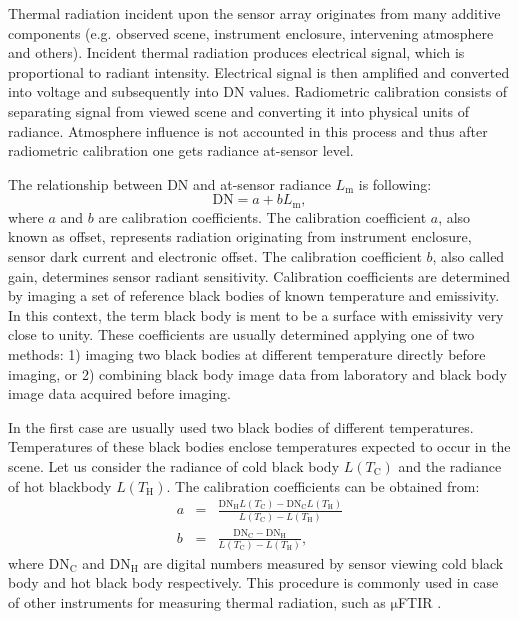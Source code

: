 Thermal radiation incident upon the sensor array originates from many additive components (e.g. observed scene, instrument enclosure, intervening atmosphere and others). Incident thermal radiation produces electrical signal, which is proportional to radiant intensity. Electrical signal is then amplified and converted into voltage and subsequently into DN values. Radiometric calibration consists of separating signal from viewed scene and converting it into physical units of radiance. Atmosphere influence is not accounted in this process and thus after radiometric calibration one gets radiance at-sensor level.

The relationship between DN and at-sensor radiance $L_\mathrm{m}$ is following:
$$ \mathrm{DN} = a + b L_\mathrm{m}, $$
where $a$ and $b$ are calibration coefficients. The calibration coefficient $a$, also known as offset, represents radiation originating from instrument enclosure, sensor dark current and electronic offset. The calibration coefficient $b$, also called gain, determines sensor radiant sensitivity. Calibration coefficients are determined by imaging a set of reference black bodies of known temperature and emissivity. In this context, the term black body is ment to be a surface with emissivity very close to unity. These coefficients are usually determined applying one of two methods: 1) imaging two black bodies at different temperature directly before imaging, or 2) combining black body image data from laboratory and black body image data acquired before imaging.

In the first case are usually used two black bodies of different temperatures. Temperatures of these black bodies enclose temperatures expected to occur in the scene. Let us consider the radiance of cold black body $L(T_\mathrm{C})$ and the radiance of hot blackbody $L(T_\mathrm{H})$. The calibration coefficients can be obtained from:
\begin{eqnarray*}
	a &=& \frac{\mathrm{DN}_\mathrm{H} L(T_\mathrm{C}) - \mathrm{DN}_\mathrm{C} L(T_\mathrm{H}) }{ L(T_\mathrm{C}) - L(T_\mathrm{H}) } \\
	b &=& \frac{\mathrm{DN}_\mathrm{C} - \mathrm{DN}_\mathrm{H}}{ L(T_\mathrm{C}) - L(T_\mathrm{H}) },
\end{eqnarray*}
where $\mathrm{DN}_\mathrm{C}$ and $\mathrm{DN}_\mathrm{H}$ are digital numbers measured by sensor viewing cold black body and hot black body respectively. This procedure is commonly used in case of other instruments for measuring thermal radiation, such as $\mathrm{\mu}$FTIR \cite{HK96}.

